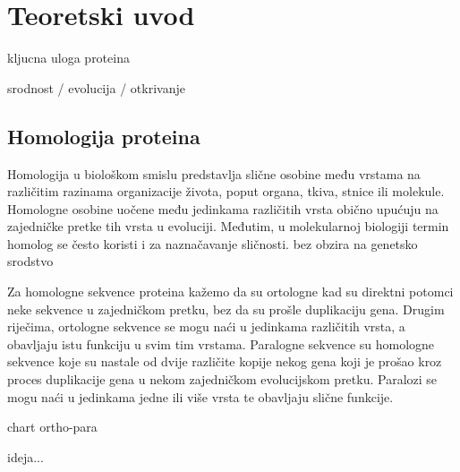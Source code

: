 \chapter{Teoretski uvod} \label{chap:teoretski-uvod}

kljucna uloga proteina

srodnost / evolucija / otkrivanje

\section{Homologija proteina}

Homologija u biološkom smislu predstavlja slične osobine među vrstama na
različitim razinama organizacije života, poput organa, tkiva, stnice ili
molekule.  Homologne osobine uočene među jedinkama različitih vrsta obično
upućuju na zajedničke pretke tih vrsta u evoluciji. Međutim, u molekularnoj
biologiji termin homolog se često koristi i za naznačavanje sličnosti. bez
obzira na genetsko srodstvo \cite{bioinfo1}

Za homologne sekvence proteina kažemo da su ortologne kad su direktni
potomci neke sekvence u zajedničkom pretku, bez da su prošle duplikaciju
gena. Drugim riječima, ortologne sekvence se mogu naći u jedinkama
različitih vrsta, a obavljaju istu funkciju u svim tim vrstama. Paralogne
sekvence su homologne sekvence koje su nastale od dvije različite kopije
nekog gena koji je prošao kroz proces duplikacije gena u nekom zajedničkom
evolucijskom pretku. Paralozi se mogu naći u jedinkama jedne ili više vrsta te
obavljaju slične funkcije.

chart ortho-para


ideja...


